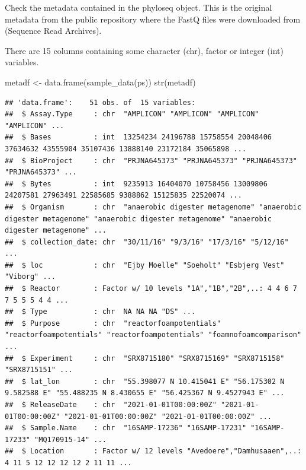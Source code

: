 \documentclass[
]{book}
\newenvironment{Shaded}{\begin{snugshade}}{\end{snugshade}}
\newcommand{\FunctionTok}[1]{\textcolor[rgb]{0.00,0.00,0.00}{#1}}
\newcommand{\NormalTok}[1]{#1}
\newcommand{\OtherTok}[1]{\textcolor[rgb]{0.56,0.35,0.01}{#1}}
\begin{document}
\hfill\break

Check the metadata contained in the phyloseq object. This is the original metadata from the public repository where the FastQ files were downloaded from (Sequence Read Archives).

There are 15 columns containing some character (chr), factor or integer (int) variables.

\begin{Shaded}
\begin{Highlighting}[]
\NormalTok{metadf }\OtherTok{\textless{}{-}} \FunctionTok{data.frame}\NormalTok{(}\FunctionTok{sample\_data}\NormalTok{(ps))}
\FunctionTok{str}\NormalTok{(metadf)}
\end{Highlighting}
\end{Shaded}

\begin{verbatim}
## 'data.frame':    51 obs. of  15 variables:
##  $ Assay.Type     : chr  "AMPLICON" "AMPLICON" "AMPLICON" "AMPLICON" ...
##  $ Bases          : int  13254234 24196788 15758554 20048406 37634632 43555904 35107436 13888140 23172184 35065898 ...
##  $ BioProject     : chr  "PRJNA645373" "PRJNA645373" "PRJNA645373" "PRJNA645373" ...
##  $ Bytes          : int  9235913 16404070 10758456 13009806 24207581 27963491 22585685 9388862 15125835 22520074 ...
##  $ Organism       : chr  "anaerobic digester metagenome" "anaerobic digester metagenome" "anaerobic digester metagenome" "anaerobic digester metagenome" ...
##  $ collection_date: chr  "30/11/16" "9/3/16" "17/3/16" "5/12/16" ...
##  $ loc            : chr  "Ejby Moelle" "Soeholt" "Esbjerg Vest" "Viborg" ...
##  $ Reactor        : Factor w/ 10 levels "1A","1B","2B",..: 4 4 6 7 7 5 5 5 4 4 ...
##  $ Type           : chr  NA NA NA "DS" ...
##  $ Purpose        : chr  "reactorfoampotentials" "reactorfoampotentials" "reactorfoampotentials" "foamnofoamcomparison" ...
##  $ Experiment     : chr  "SRX8715180" "SRX8715169" "SRX8715158" "SRX8715151" ...
##  $ lat_lon        : chr  "55.398077 N 10.415041 E" "56.175302 N 9.582588 E" "55.488235 N 8.430655 E" "56.425367 N 9.4527943 E" ...
##  $ ReleaseDate    : chr  "2021-01-01T00:00:00Z" "2021-01-01T00:00:00Z" "2021-01-01T00:00:00Z" "2021-01-01T00:00:00Z" ...
##  $ Sample.Name    : chr  "16SAMP-17236" "16SAMP-17231" "16SAMP-17233" "MQ170915-14" ...
##  $ Location       : Factor w/ 12 levels "Avedoere","Damhusaaen",..: 4 11 5 12 12 12 12 2 11 11 ...
\end{verbatim}

\hfill\break
\end{document}
